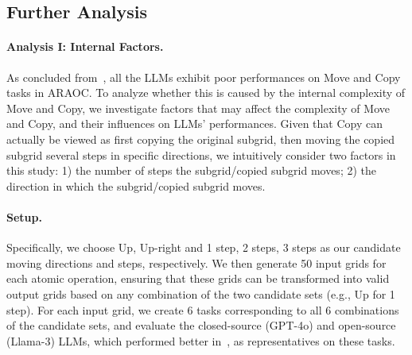 \subsection{Further Analysis}
\paragraph{Analysis I: Internal Factors.}
As concluded from~, all the LLMs exhibit poor performances on Move and Copy tasks in ARAOC. To analyze whether this is caused by the internal complexity of Move and Copy, we investigate factors that may affect the complexity of Move and Copy, and their influences on LLMs' performances. Given that Copy can actually be viewed as first copying the original subgrid, then moving the copied subgrid several steps in specific directions, we intuitively consider two factors in this study: 1) the number of steps the subgrid/copied subgrid moves; 2) the direction in which the subgrid/copied subgrid moves.

\paragraph{Setup.}
Specifically, we choose {Up, Up-right} and {1 step, 2 steps, 3 steps} as our candidate moving directions and steps, respectively. We then generate 50 input grids for each atomic operation, ensuring that these grids can be transformed into valid output grids based on any combination of the two candidate sets (e.g., Up for 1 step). For each input grid, we create 6 tasks corresponding to all 6 combinations of the candidate sets, and evaluate the closed-source (GPT-4o) and open-source (Llama-3) LLMs, which performed better in~, as representatives on these tasks.


